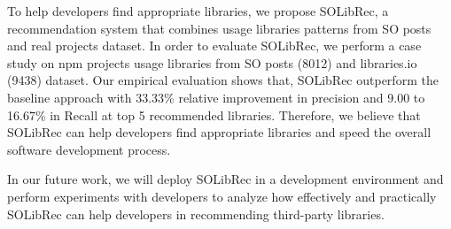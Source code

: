 \documentclass[paper]{ieice}
\newcommand{\RqTwo}{\textbf{RQ$_2$: Does SOLibRec accurately recommend third-party libraries?}}
\newcommand{\RqThree}{\textbf{RQ$_3$: Why does SOLibRec outperform CrossRec?}}
\begin{document}
To help developers find appropriate libraries, we propose SOLibRec, a recommendation system that combines usage libraries patterns from SO posts and real projects dataset. In order to evaluate SOLibRec, we perform a case study on npm projects usage libraries from SO posts (8012) and libraries.io (9438) dataset. Our empirical evaluation shows that, SOLibRec outperform the baseline approach with 33.33\% relative improvement in precision and 9.00 to 16.67\% in Recall at top 5 recommended libraries. Therefore, we believe that SOLibRec can help developers find appropriate libraries and speed the overall software development process.

In our future work, we will deploy SOLibRec in a development environment and perform experiments with developers to analyze how effectively and practically SOLibRec can help developers in recommending third-party libraries.

    
    
 









\end{document}
